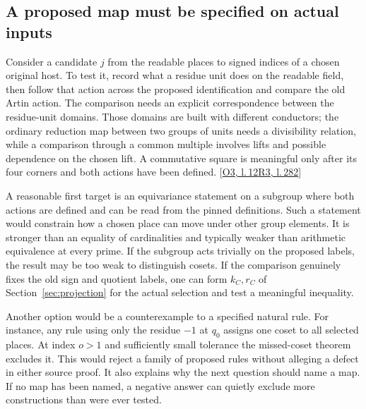 \documentclass[12pt,letterpaper]{article}
\begin{document}
\subsection{A proposed map must be specified on actual inputs}
Consider a candidate $j$ from the readable places to signed indices of a chosen original host. To test it, record what a residue unit does on the readable field, then follow that action across the proposed identification and compare the old Artin action. The comparison needs an explicit correspondence between the residue-unit domains. Those domains are built with different conductors; the ordinary reduction map between two groups of units needs a divisibility relation, while a comparison through a common multiple involves lifts and possible dependence on the chosen lift. A commutative square is meaningful only after its four corners and both actions have been defined.  {\footnotesize\sffamily\color{mute}[\href{https://github.com/nousentllc/riemann-hypothesis/blob/40e56bab026552e089d7afcfeff08d2defb9c005/src/Formalism/SharpRestriction/RamificationFrobenius/TotientGaloisClasses/ConjEMemHostFIff.lean\#L12}{O3, l.\,12}\enspace \href{https://github.com/leanprover-community/riemann-hypothesis/blob/e063a923620ee7787b4a1270421478645bf66bdb/src/New/Reduction/Data/FieldsAndPlaces.lean\#L282}{R3, l.\,282}]}

A reasonable first target is an equivariance statement on a subgroup where both actions are defined and can be read from the pinned definitions. Such a statement would constrain how a chosen place can move under other group elements. It is stronger than an equality of cardinalities and typically weaker than arithmetic equivalence at every prime. If the subgroup acts trivially on the proposed labels, the result may be too weak to distinguish cosets. If the comparison genuinely fixes the old sign and quotient labels, one can form $k_C,r_C$ of Section~\ref{sec:projection} for the actual selection and test a meaningful inequality.

Another option would be a counterexample to a specified natural rule. For instance, any rule using only the residue $-1$ at $q_0$ assigns one coset to all selected places. At index $o>1$ and sufficiently small tolerance the missed-coset theorem excludes it. This would reject a family of proposed rules without alleging a defect in either source proof. It also explains why the next question should name a map. If no map has been named, a negative answer can quietly exclude more constructions than were ever tested.
\end{document}
